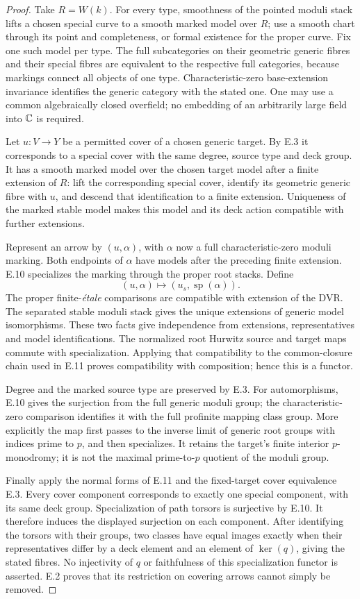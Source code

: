 \begin{proof}
Take $R=W(k)$. For every type, smoothness of the pointed moduli
stack lifts a chosen special curve to a smooth marked model
over $R$; use a smooth chart through its point and completeness,
or formal existence for the proper curve. Fix one such model
per type. The full subcategories on their geometric generic
fibres and their special fibres are equivalent to the respective
full categories, because markings connect all objects of one
type. Characteristic-zero base-extension invariance identifies
the generic category with the stated one. One may use a common
algebraically closed overfield; no embedding of an arbitrarily
large field into $\mathbb C$ is required.

Let $u:V\to Y$ be a permitted cover of a chosen generic target.
By E.3 it corresponds to a special cover with the same degree,
source type and deck group. It has a smooth marked model over
the chosen target model after a finite extension of $R$:
lift the corresponding special cover, identify its geometric
generic fibre with $u$, and descend that identification to a
finite extension. Uniqueness of the marked stable model makes
this model and its deck action compatible with further
extensions.

Represent an arrow by $(u,\alpha)$, with $\alpha$ now a full
characteristic-zero moduli marking. Both endpoints of $\alpha$
have models after the preceding finite extension. E.10 specializes
the marking through the proper root stacks. Define
\[
                      (u,\alpha)\longmapsto
                         (u_s,\operatorname{sp}(\alpha)).
\]
The proper finite-\emph{\'etale} comparisons are compatible
with extension of the DVR. The separated stable moduli stack
gives the unique extensions of generic model isomorphisms.
These two facts give independence from extensions, representatives
and model identifications. The normalized root Hurwitz source
and target maps commute with specialization. Applying that
compatibility to the common-closure chain used in E.11 proves
compatibility with composition; hence this is a functor.

Degree and the marked source type are preserved by E.3. For
automorphisms, E.10 gives the surjection from the full generic
moduli group; the characteristic-zero comparison identifies it
with the full profinite mapping class group. More explicitly
the map first passes to the inverse limit of generic root
groups with indices prime to $p$, and then specializes. It
retains the target's finite interior $p$-monodromy; it is not
the maximal prime-to-$p$ quotient of the moduli group.

Finally apply the normal forms of E.11 and the fixed-target
cover equivalence E.3. Every cover component corresponds to
exactly one special component, with its same deck group.
Specialization of path torsors is surjective by E.10. It
therefore induces the displayed surjection on each component.
After identifying the torsors with their groups, two classes
have equal images exactly when their representatives differ
by a deck element and an element of $\ker(q)$, giving the
stated fibres. No injectivity of $q$ or faithfulness of this
specialization functor is asserted. E.2 proves that its
restriction on covering arrows cannot simply be removed.
\end{proof}
